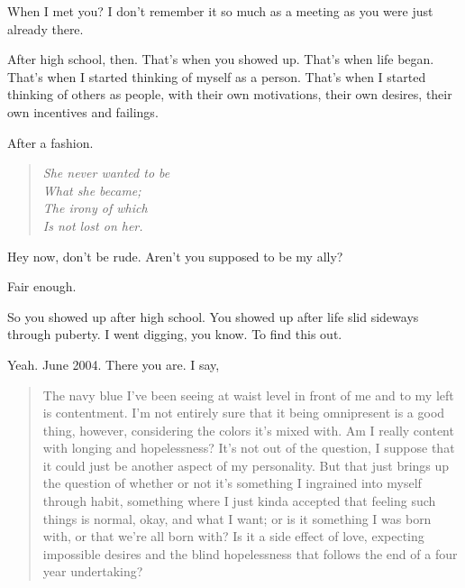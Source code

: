 
When I met you? I don't remember it so much as a meeting as you were just already there.


After high school, then. That's when you showed up. That's when life began. That's when I started thinking of myself as a person. That's when I started thinking of others as people, with their own motivations, their own desires, their own incentives and failings.


After a fashion.


\begin{verse}
\emph{She never wanted to be\\
\vin What she became;\\
\vin \vin The irony of which\\
\vin \vin \vin Is not lost on her.}
\end{verse}


Hey now, don't be rude. Aren't you supposed to be my ally?


Fair enough.

So you showed up after high school. You showed up after life slid sideways through puberty. I went digging, you know. To find this out.


Yeah. June 2004. There you are. I say,

\begin{quotation}
The navy blue I've been seeing at waist level in front of me and to my left is contentment. I'm not entirely sure that it being omnipresent is a good thing, however, considering the colors it's mixed with. Am I really content with longing and hopelessness? It's not out of the question, I suppose that it could just be another aspect of my personality. But that just brings up the question of whether or not it's something I ingrained into myself through habit, something where I just kinda accepted that feeling such things is normal, okay, and what I want; or is it something I was born with, or that we're all born with? Is it a side effect of love, expecting impossible desires and the blind hopelessness that follows the end of a four year undertaking?
\end{quotation}

